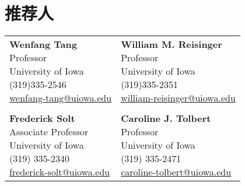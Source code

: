 \documentclass[10.5pt,]{article}
\begin{document}
\section{推荐人}

\begin{tabular}{ll}
\parbox{5cm}{\textbf{Wenfang Tang }\\Professor\\University of Iowa\\(319)335-2546\\\href{mailto:wenfang-tang@uiowa.edu}{wenfang-tang@uiowa.edu}}
 &\parbox{5cm}{\textbf{William M. Reisinger}\\Professor\\University of Iowa\\(319)335-2351\\\href{mailto:william-reisinger@uiowa.edu}{william-reisinger@uiowa.edu}}\\
&\\
\parbox{5cm}{\textbf{Frederick Solt}\\Associate Professor\\University of Iowa\\(319) 335-2340\\\href{mailto:frederick-solt@uiowa.edu}{frederick-solt@uiowa.edu}}
 &\parbox{5cm}{\textbf{Caroline J. Tolbert}\\Professor\\University of Iowa\\(319) 335-2471\\\href{caroline-tolbert@uiowa.edu}{caroline-tolbert@uiowa.edu}}\\
\end{tabular}
\end{document}

